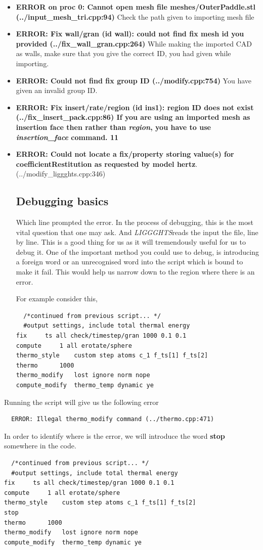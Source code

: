 \documentclass{tufte-book} %
\newcommand{\Li}{\textit{LIGGGHTS}}
\begin{document}
\begin{itemize}
\item \textbf{ERROR on proc 0: Cannot open mesh file meshes/OuterPaddle.stl (../input\_mesh\_tri.cpp:94)} Check the path given to importing mesh file
\item\textbf{ERROR: Fix wall/gran (id wall): could not find fix mesh id you provided (../fix\_wall\_gran.cpp:264)} While making the imported CAD as walls, make sure that you give the correct ID, you had given while importing.
\item \textbf{ERROR: Could not find fix group ID (../modify.cpp:754)} You have given an invalid group ID.
\item \textbf{ERROR: Fix insert/rate/region (id ins1): region ID does not exist (../fix\_insert\_pack.cpp:86) If you are using an imported mesh as insertion face then rather than \textit{region}, you have to use \textit{insertion\_face} command.
11
}
  \item \textbf{ERROR: Could not locate a fix/property storing value(s) for coefficientRestitution as requested by model hertz}. (../modify\_liggghts.cpp:346)
  
\subsection{Debugging basics}

Which line prompted the error. In the process of debugging, this is the most vital question that one may ask. And \Li reads the input the file, line by line. This is a good thing for us as it will tremendously useful for us to debug it. One of the important method you could use to debug, is introducing a foreign word or an unrecognised word into the script which is bound to make it fail. This would help us narrow down to the region where there is an error.

For example consider this,

\begin{verbatim}
  /*continued from previous script... */
  #output settings, include total thermal energy
fix		ts all check/timestep/gran 1000 0.1 0.1
compute		1 all erotate/sphere
thermo_style	custom step atoms c_1 f_ts[1] f_ts[2]  
thermo		1000
thermo_modify	lost ignore norm nope
compute_modify	thermo_temp dynamic ye
  \end{verbatim}
\end{itemize}

Running the script will give us the following error
\begin{verbatim}
  ERROR: Illegal thermo_modify command (../thermo.cpp:471)
\end{verbatim}
In order to identify where is the error, we will introduce the word \textbf{stop} somewhere in the code.
\begin{verbatim}
  /*continued from previous script... */
  #output settings, include total thermal energy
fix		ts all check/timestep/gran 1000 0.1 0.1
compute		1 all erotate/sphere
thermo_style	custom step atoms c_1 f_ts[1] f_ts[2]  
stop
thermo		1000
thermo_modify	lost ignore norm nope
compute_modify	thermo_temp dynamic ye
  \end{verbatim}
\end{document}
